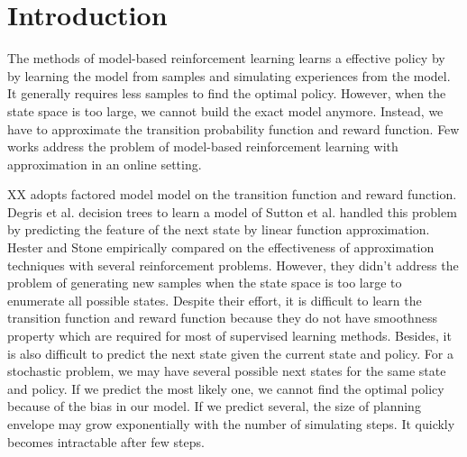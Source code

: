 \documentclass{article} %
\begin{document}

\section{Introduction}



The methods of model-based reinforcement learning learns a effective policy by 
by learning the model from samples and simulating experiences
from the model. It generally requires less samples to find the optimal policy. 
However, when the state space is too large, we cannot build the exact model anymore.
Instead, we have to approximate the transition probability function and 
reward function. Few works address the problem of model-based reinforcement learning
with approximation in an online setting.

XX adopts factored model model on the transition function and reward function.
Degris et al.  decision trees to learn a model of
Sutton et al. handled this problem by predicting the feature of the next state by linear function approximation.
Hester and Stone empirically compared on the effectiveness of 
approximation techniques with several reinforcement problems.
However, they didn't address the problem of generating 
new samples when the state space is too large to enumerate
all possible states.
Despite their effort, it is difficult to learn 
the transition function and reward function because they do not have smoothness property which
are required for most of supervised learning methods. Besides, it is also difficult to predict 
the next state given the current state and policy. For a stochastic problem, we may have
several possible next states for the same state and policy. If we predict the most likely one, 
we cannot find the optimal policy because of the bias in our model. If we predict several,
the size of planning envelope may grow exponentially with the number of simulating steps.
It quickly becomes intractable after few steps.
\end{document}
